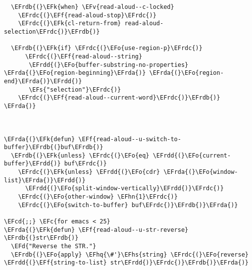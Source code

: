 \documentclass[a4wide,10pt]{article}
\newcommand{\EFc}[1]{\textcolor{EFc}{#1}} %
\newcommand{\EFcd}[1]{\textcolor{EFcd}{#1}} %
\newcommand{\EFs}[1]{\textcolor{EFs}{#1}} %
\newcommand{\EFd}[1]{\textcolor{EFd}{#1}} %
\newcommand{\EFk}[1]{\textcolor{EFk}{#1}} %
\newcommand{\EFf}[1]{\textcolor{EFf}{#1}} %
\newcommand{\EFv}[1]{\textcolor{EFv}{#1}} %
\newcommand{\EFo}[1]{\textcolor{EFo}{#1}} %
\newcommand{\EFhn}[1]{\textcolor{EFhn}{\textbf{#1}}} %
\newcommand{\EFhq}[1]{\textcolor{EFhq}{#1}} %
\newcommand{\EFhs}[1]{\textcolor{EFhs}{#1}} %
\newcommand{\EFrda}[1]{\textcolor{EFrda}{#1}} %
\newcommand{\EFrdb}[1]{\textcolor{EFrdb}{#1}} %
\newcommand{\EFrdc}[1]{\textcolor{EFrdc}{#1}} %
\newcommand{\EFrdd}[1]{\textcolor{EFrdd}{#1}} %
\begin{document}
\begin{Code}
\begin{Verbatim}
  \EFrdb{(}\EFk{when} \EFv{read-aloud--c-locked}
    \EFrdc{(}\EFf{read-aloud-stop}\EFrdc{)}
    \EFrdc{(}\EFk{cl-return-from} read-aloud-selection\EFrdc{)}\EFrdb{)}

  \EFrdb{(}\EFk{if} \EFrdc{(}\EFo{use-region-p}\EFrdc{)}
      \EFrdc{(}\EFf{read-aloud--string}
       \EFrdd{(}\EFo{buffer-substring-no-properties} \EFrda{(}\EFo{region-beginning}\EFrda{)} \EFrda{(}\EFo{region-end}\EFrda{)}\EFrdd{)}
       \EFs{"selection"}\EFrdc{)}
    \EFrdc{(}\EFf{read-aloud--current-word}\EFrdc{)}\EFrdb{)} \EFrda{)}



\EFrda{(}\EFk{defun} \EFf{read-aloud--u-switch-to-buffer}\EFrdb{(}buf\EFrdb{)}
  \EFrdb{(}\EFk{unless} \EFrdc{(}\EFo{eq} \EFrdd{(}\EFo{current-buffer}\EFrdd{)} buf\EFrdc{)}
    \EFrdc{(}\EFk{unless} \EFrdd{(}\EFo{cdr} \EFrda{(}\EFo{window-list}\EFrda{)}\EFrdd{)}
      \EFrdd{(}\EFo{split-window-vertically}\EFrdd{)}\EFrdc{)}
    \EFrdc{(}\EFo{other-window} \EFhn{1}\EFrdc{)}
    \EFrdc{(}\EFo{switch-to-buffer} buf\EFrdc{)}\EFrdb{)}\EFrda{)}

\EFcd{;;} \EFc{for emacs < 25}
\EFrda{(}\EFk{defun} \EFf{read-aloud--u-str-reverse} \EFrdb{(}str\EFrdb{)}
  \EFd{"Reverse the STR."}
  \EFrdb{(}\EFo{apply} \EFhq{\#'}\EFhs{string} \EFrdc{(}\EFo{reverse} \EFrdd{(}\EFf{string-to-list} str\EFrdd{)}\EFrdc{)}\EFrdb{)}\EFrda{)}


\end{Verbatim}
\end{Code}
\end{document}
